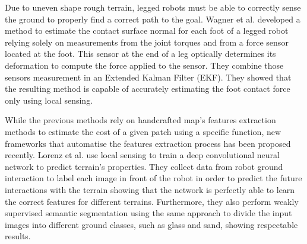\documentclass[../document.tex]{subfiles}
\begin{document}
Due to uneven shape rough terrain, legged robots must be able to correctly sense the ground to properly find a correct path to the goal. Wagner et al. \cite{wagner2016foot} developed a method to estimate the contact surface normal for each foot of a legged robot relying solely on measurements from the joint torques and from a force sensor located at the foot. This sensor at the end of a leg optically determines its deformation to compute the force applied to the sensor. They combine those sensors measurement in an Extended Kalman Filter (EKF). They showed that the resulting method is capable of accurately estimating the foot contact force only using local sensing.

While the previous methods rely on handcrafted map's features extraction methods to estimate the cost of a given patch using a specific function, new frameworks that automatise the features extraction process has been proposed recently. Lorenz et al. \cite{wellhausen2019where} use local sensing to train a deep convolutional neural network to predict terrain's properties. They collect data from robot ground interaction to label each image in front of the robot in order to predict the future interactions with the terrain showing that the network is perfectly able to learn the correct features for different terrains.
Furthermore, they also perform weakly supervised semantic segmentation using the same approach to divide the input images into different ground classes, such as glass and sand, showing respectable results.

\end{document}
